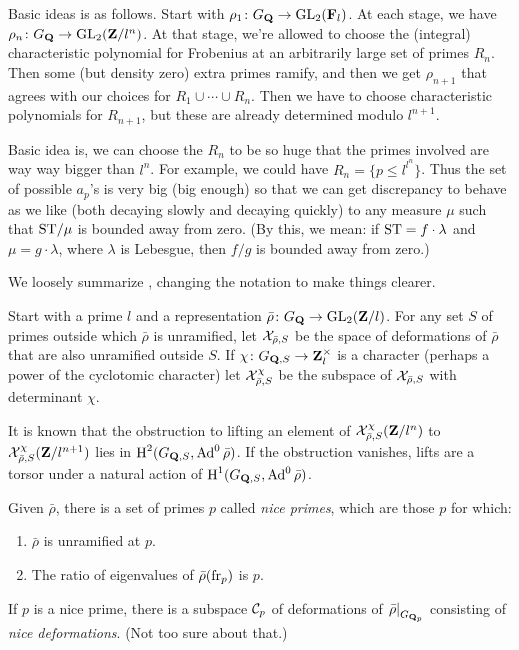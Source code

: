 Basic ideas is as follows. Start with $\rho_1\colon G_{\mathbf{Q}} \to \operatorname{GL}_2(\mathbf{F}_l)$. At 
each stage, we have $\rho_n\colon G_{\mathbf{Q}} \to \operatorname{GL}_2(\mathbf{Z}/l^n)$. At that stage, 
we're allowed to choose the (integral) characteristic polynomial for Frobenius 
at an arbitrarily large set of primes $R_n$. Then some (but density zero) extra 
primes ramify, and then we get $\rho_{n+1}$ that agrees with our choices for 
$R_1\cup \cdots \cup R_n$. Then we have to choose characteristic polynomials for 
$R_{n+1}$, but these are already determined modulo $l^{n+1}$. 

Basic idea is, we can choose the $R_n$ to be so huge that the primes involved are 
way way bigger than $l^n$. For example, we could have 
$R_n=\{p\leqslant l^{l^n}\}$. Thus the set of possible $a_p$'s is very big (big 
enough) so that we can get discrepancy to behave as we like (both decaying 
slowly and decaying quickly) to any measure $\mu$ such that $\mathrm{ST}/\mu$ is 
bounded away from zero. (By this, we mean: if $\mathrm{ST}=f\cdot\lambda$ and 
$\mu = g\cdot\lambda$, where $\lambda$ is Lebesgue, then $f/g$ is bounded away 
from zero.)

We loosely summarize \cite{pande-2011}, changing the notation to make things 
clearer. 

Start with a prime $l$ and a representation 
$\bar\rho\colon G_{\mathbf{Q}} \to \operatorname{GL}_2(\mathbf{Z}/l)$. For any set $S$ of primes outside 
which $\bar\rho$ is unramified, let $\mathcal{X}_{\bar\rho,S}$ be the space of 
deformations of $\bar\rho$ that are also unramified outside $S$. If 
$\chi\colon G_{\mathbf{Q},S} \to \mathbf{Z}_l^\times$ is a character (perhaps a power of the 
cyclotomic character) let $\mathcal{X}_{\bar\rho,S}^\chi$ be the subspace of 
$\mathcal{X}_{\bar\rho,S}$ with determinant $\chi$. 

It is known that the obstruction to lifting an element of 
$\mathcal{X}_{\bar\rho,S}^\chi(\mathbf{Z}/l^n)$ to $\mathcal{X}_{\bar\rho,S}^\chi(\mathbf{Z}/l^{n+1})$ lies 
in $\operatorname{H}^2(G_{\mathbf{Q},S},\operatorname{Ad}^0\bar\rho)$. If the obstruction vanishes, lifts are a
torsor under a natural action of $\operatorname{H}^1(G_{\mathbf{Q},S},\operatorname{Ad}^0\bar\rho)$. 

Given $\bar\rho$, there is a set of primes $p$ called \emph{nice primes}, which 
are those $p$ for which:
\begin{enumerate}
\item
$\bar\rho$ is unramified at $p$.

\item
The ratio of eigenvalues of $\bar\rho(\mathrm{fr}_p)$ is $p$. 
\end{enumerate}
If $p$ is a nice prime, there is a subspace $\mathcal{C}_p$ of deformations of 
$\left.\bar\rho\right|_{G_{\mathbf{Q}_p}}$ consisting of \emph{nice deformations}. 
(Not too sure about that.)

